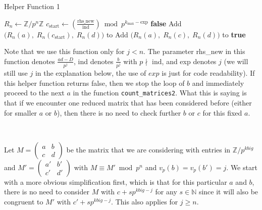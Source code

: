 \documentclass[letterpaper,12pt]{article}
\newcommand{\Z}{\mathbb{Z}}
\begin{document}
\begin{algorithm}[H]
\caption{Helper Function 1}
\begin{algorithmic}[1]
    \State $R_n \gets \mathbb{Z}/p^n\mathbb{Z}$
    \State $c_{\text{start}} \gets \left( \frac{\text{rhs\_new}}{\text{ind}} \right) \bmod p^{k_{\max} - \text{exp}}$
        \State \Return \textbf{false}
    \EndIf
    \State Add $\big( R_n(a),\; R_n(c_{\text{start}}),\; R_n(d) \big)$ to 
        \State Add $\big( R_n(a),\; R_n(c),\; R_n(d) \big)$ to 
    \EndFor
    \State \Return \textbf{true}
\EndFunction
\end{algorithmic}
\end{algorithm}

Note that we use this function only for $j < n$.
The parameter rhs\_new in this function denotes 
$\frac{ad-D}{p^j}$, ind denotes $\frac{b}{p^j}$ with 
$p \nmid $ ind, and exp denotes $j$ (we will still use $j$ in the explanation below, 
the use of $exp$ is just for code readability).
If this helper function returns false, then we stop the loop 
of $b$ and immediately proceed to the next $a$ in the function \texttt{count\_matrices2}.
What this is saying is that if we encounter one reduced matrix 
that has been considered before (either for smaller $a$ or $b$),
then there is no need to check further $b$ or $c$ for this fixed $a$.

\

Let $M = \begin{pmatrix} a & b \\ c & d \end{pmatrix}$ 
be the matrix that we are considering
with entries in $\Z / p^{kbig}$ and
$M' = \begin{pmatrix} a' & b' \\ c' & d' \end{pmatrix}$
with $M \equiv M' \bmod p^n$ and $v_p(b) = v_p(b') = j$.
We start with a more obvious simplification first, which is that 
for this particular $a$ and $b$,
there is no need to consider $M$ with $c + sp^{kbig-j}$ for any $s \in \mathbb{N}$
since it will also be congruent to $M'$ with $c' + sp^{kbig-j}$.
This also applies for $j \geq n$.

\
\end{document}
